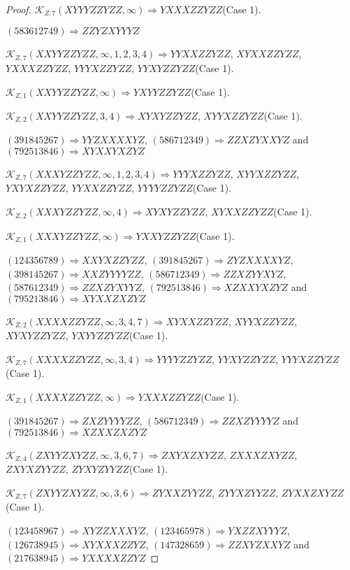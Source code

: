 \documentclass[12pt]{article}
\theoremstyle{plain}
\theoremstyle{definition}
\theoremstyle{remark}
\newcommand{\fancy}[1]{\mathcal{#1}}
\def\K{\fancy{K}}
\begin{document}
\begin{proof}
	$\K_{Z,7}(XYYYZZYZZ,\infty)\Rightarrow $$YXXXZZYZZ$(Case 1).
	
	
	
	$(5 8 3 6 1 2 7 4 9)\Rightarrow ZZYZXYYYZ$
	
	
	$\K_{Z,7}(XXYYZZYZZ,\infty,1, 2, 3, 4)\Rightarrow $$YYXXZZYZZ$, $XYXXZZYZZ$, $YXXXZZYZZ$, $YYYXZZYZZ$, $YYXYZZYZZ$(Case 1).
	
	$\K_{Z,1}(XXYYZZYZZ,\infty)\Rightarrow $$YXYYZZYZZ$(Case 1).
	
	$\K_{Z,2}(XXYYZZYZZ,3, 4)\Rightarrow $$XYXYZZYZZ$, $XYYXZZYZZ$(Case 1).
	
	
	
	$(3 9 1 8 4 5 2 6 7)\Rightarrow YYZXXXXYZ$, $(5 8 6 7 1 2 3 4 9)\Rightarrow ZZXZYXXYZ$ and $(7 9 2 5 1 3 8 4 6)\Rightarrow XYXXYXZYZ$
	
	
	$\K_{Z,7}(XXXYZZYZZ,\infty,1, 2, 3, 4)\Rightarrow $$YYYXZZYZZ$, $XYYXZZYZZ$, $YXYXZZYZZ$, $YYXXZZYZZ$, $YYYYZZYZZ$(Case 1).
	
	$\K_{Z,2}(XXXYZZYZZ,\infty,4)\Rightarrow $$XYXYZZYZZ$, $XYXXZZYZZ$(Case 1).
	
	$\K_{Z,1}(XXXYZZYZZ,\infty)\Rightarrow $$YXXYZZYZZ$(Case 1).
	
	
	
	$(1 2 4 3 5 6 7 8 9)\Rightarrow XXYXZZYZZ$, $(3 9 1 8 4 5 2 6 7)\Rightarrow ZYZXXXXYZ$, $(3 9 8 1 4 5 2 6 7)\Rightarrow XXZYYYYZZ$, $(5 8 6 7 1 2 3 4 9)\Rightarrow ZZXZYYXYZ$, $(5 8 7 6 1 2 3 4 9)\Rightarrow ZZXZYXYYZ$, $(7 9 2 5 1 3 8 4 6)\Rightarrow XZXXYXZYZ$ and $(7 9 5 2 1 3 8 4 6)\Rightarrow XYXXZXZYZ$
	
	
	$\K_{Z,2}(XXXXZZYZZ,\infty,3, 4, 7)\Rightarrow $$XYXXZZYZZ$, $XYYXZZYZZ$, $XYXYZZYZZ$, $YXYYZZYZZ$(Case 1).
	
	$\K_{Z,7}(XXXXZZYZZ,\infty,3, 4)\Rightarrow $$YYYYZZYZZ$, $YYXYZZYZZ$, $YYYXZZYZZ$(Case 1).
	
	$\K_{Z,1}(XXXXZZYZZ,\infty)\Rightarrow $$YXXXZZYZZ$(Case 1).
	
	
	
	$(3 9 1 8 4 5 2 6 7)\Rightarrow ZXZYYYYZZ$, $(5 8 6 7 1 2 3 4 9)\Rightarrow ZZXZYYYYZ$ and $(7 9 2 5 1 3 8 4 6)\Rightarrow XZXXZXZYZ$
	
	
	$\K_{Z,4}(ZXYYZXYZZ,\infty,3, 6, 7)\Rightarrow $$ZXYXZXYZZ$, $ZXXXZXYZZ$, $ZXYXZYYZZ$, $ZYXYZYYZZ$(Case 1).
	
	$\K_{Z,7}(ZXYYZXYZZ,\infty,3, 6)\Rightarrow $$ZYXXZYYZZ$, $ZYYXZYYZZ$, $ZYXXZXYZZ$(Case 1).
	
	
	
	$(1 2 3 4 5 8 9 6 7)\Rightarrow XYZZXXXYZ$, $(1 2 3 4 6 5 9 7 8)\Rightarrow YXZZXYYYZ$, $(1 2 6 7 3 8 9 4 5)\Rightarrow XYXXXZZYZ$, $(1 4 7 3 2 8 6 5 9)\Rightarrow ZZXYZXXYZ$ and $(2 1 7 6 3 8 9 4 5)\Rightarrow YXXXXZZYZ$
	

\end{proof}
\end{document}
